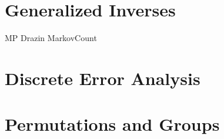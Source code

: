 \documentclass{newsiambook}
\begin{document}
\part{Generalized Inverses}
{MP}
{Drazin}
{MarkovCount}

\part{Discrete Error Analysis}

\part{Permutations and Groups}











% 








\end{document}
